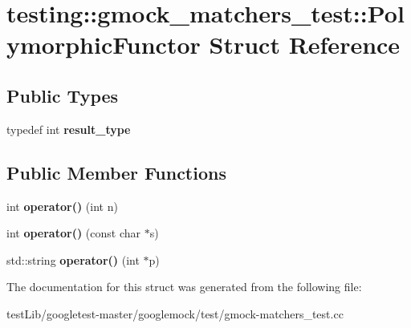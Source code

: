 \hypertarget{structtesting_1_1gmock__matchers__test_1_1PolymorphicFunctor}{}\section{testing\+:\+:gmock\+\_\+matchers\+\_\+test\+:\+:Polymorphic\+Functor Struct Reference}
\label{structtesting_1_1gmock__matchers__test_1_1PolymorphicFunctor}
\subsection*{Public Types}
\begin{DoxyCompactItemize}
\item 
\mbox{\label{structtesting_1_1gmock__matchers__test_1_1PolymorphicFunctor_ae2b921ecae158b5eaa11a29ac6fe0cf3}} 
typedef int {\bfseries result\+\_\+type}
\end{DoxyCompactItemize}
\subsection*{Public Member Functions}
\begin{DoxyCompactItemize}
\item 
\mbox{\label{structtesting_1_1gmock__matchers__test_1_1PolymorphicFunctor_a2fb8b012acd2ccd52788231036877c98}} 
int {\bfseries operator()} (int n)
\item 
\mbox{\label{structtesting_1_1gmock__matchers__test_1_1PolymorphicFunctor_aee4d200c7f85ce4d8048d1798a511002}} 
int {\bfseries operator()} (const char $\ast$s)
\item 
\mbox{\label{structtesting_1_1gmock__matchers__test_1_1PolymorphicFunctor_afadd033a9ae644f159fff6c14a247a70}} 
std\+::string {\bfseries operator()} (int $\ast$p)
\end{DoxyCompactItemize}


The documentation for this struct was generated from the following file\+:\begin{DoxyCompactItemize}
\item 
test\+Lib/googletest-\/master/googlemock/test/gmock-\/matchers\+\_\+test.\+cc\end{DoxyCompactItemize}
